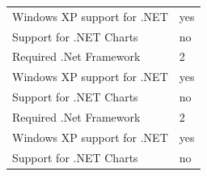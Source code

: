 \begin{center}
\begin{longtable}{p{4cm}  p{12cm}  }
		Windows XP support for .NET & 	yes \\
		Support for .NET Charts &	no  \\
		Required .Net Framework &	2	 \\
		Windows XP support for .NET & 	yes \\
		Support for .NET Charts &	no  \\
		Required .Net Framework &	2	 \\
		Windows XP support for .NET & 	yes \\
		Support for .NET Charts &	no  \\
	\end{longtable}
\end{center}

